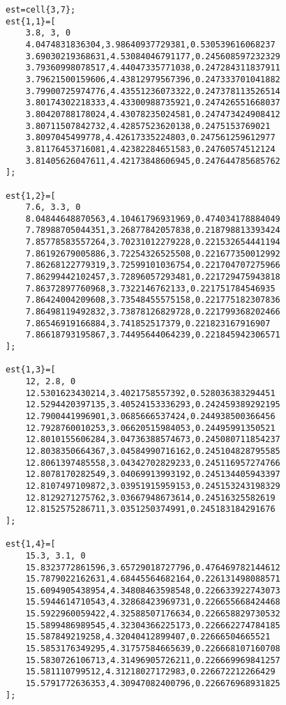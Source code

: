\renewcommand{\baselinestretch}{0.5}
\twocolumn
\tiny
\begin{verbatim}
est=cell{3,7};
est{1,1}=[
    3.8, 3, 0
    4.0474831836304,3.98640937729381,0.530539616068237
    3.69030219368631,4.53084046791177,0.245608597232329
    3.79360998078517,4.44047335771038,0.247284311837911
    3.79621500159606,4.43812979567396,0.247333701041882
    3.79900725974776,4.43551236073322,0.247378113526514
    3.80174302218333,4.43300988735921,0.247426551668037
    3.80420788178024,4.43078235024581,0.247473424908412
    3.80711507842732,4.42857523620138,0.2475153769021
    3.8097045499778,4.42617335224803,0.247561259612977
    3.81176453716081,4.42382284651583,0.24760574512124
    3.81405626047611,4.42173848606945,0.247644785685762
];

est{1,2}=[
    7.6, 3.3, 0
    8.04844648870563,4.10461796931969,0.474034178884049
    7.78988705044351,3.26877842057838,0.218798813393424
    7.85778583557264,3.70231012279228,0.221532654441194
    7.86192679005886,3.72254326525508,0.221677350012992
    7.86268122779319,3.72599101036754,0.221704707275966
    7.86299442102457,3.72896057293481,0.221729475943818
    7.86372897760968,3.7322146762133,0.221751784546935
    7.86424004209608,3.73548455575158,0.221775182307836
    7.86498119492832,3.73878126829728,0.221799368202466
    7.86546919166884,3.741852517379,0.221823167916907
    7.86618793195867,3.74495644064239,0.221845942306571
];

est{1,3}=[
    12, 2.8, 0
    12.5301623430214,3.4021758557392,0.528036383294451
    12.5294420397135,3.40524153336293,0.242459389292195
    12.7900441996901,3.0685666537424,0.244938500366456
    12.7928760010253,3.06620515984053,0.24495991350521
    12.8010155606284,3.04736388574673,0.245080711854237
    12.8038350664367,3.04584990716162,0.245104828795585
    12.8061397485558,3.04342702829233,0.245116957274766
    12.8078170282549,3.04069913993192,0.245134405943397
    12.8107497109872,3.03951915959153,0.245153243198329
    12.8129271275762,3.03667948673614,0.24516325582619
    12.8152575286711,3.0351250374991,0.245183184291676
];

est{1,4}=[
    15.3, 3.1, 0
    15.8323772861596,3.65729018727796,0.476469782144612
    15.7879022162631,4.68445564682164,0.226131498088571
    15.6094905438954,4.34808463598548,0.226633922743073
    15.5944614710543,4.32868423969731,0.226655668424468
    15.5922960059422,4.32588507176634,0.226658829730532
    15.5899486989545,4.32304366225173,0.226662274784185
    15.587849219258,4.32040412899407,0.22666504665521
    15.5853176349295,4.31757584665639,0.226668107160708
    15.5830726106713,4.31496905726211,0.226669969841257
    15.581110799512,4.31218027172983,0.226672212266429
    15.5791772636353,4.30947082400796,0.226676968931825
];


\end{verbatim}
